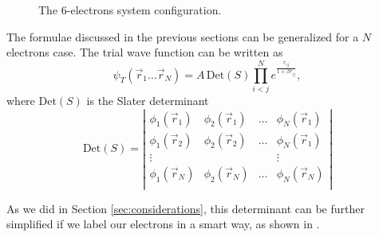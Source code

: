 \documentclass[a4paper,twoside,11pt]{book}
\begin{document}
\begin{figure}[H]
	\centering
	\caption{The 6-electrons system configuration.}
	\label{eq:sketch_6e}
\end{figure}

The formulae discussed in the previous sections can be generalized for a $N$ electrons case. The trial wave function can be written as
\begin{equation}
	\psi_T(\vec{r}_1 \dots \vec{r}_N)= A \,  \text{Det}(S) \prod_{i<j}^N e^{\frac{r_{ij}}{1+\beta r_{ij}}},
\end{equation}
where $\text{Det}(S)$ is the Slater determinant
\begin{equation}
	\text{Det}(S)= \left|
	\begin{matrix}
		\phi_1(\vec{r}_1) & \phi_2(\vec{r}_1) & \dots & \phi_N(\vec{r}_1) \\
		\phi_1(\vec{r}_2) & \phi_2(\vec{r}_2) & \dots & \phi_N(\vec{r}_1) \\
		\vdots &  &  & \vdots \\
		\phi_1(\vec{r}_N) & \phi_2(\vec{r}_N) & \dots & \phi_N(\vec{r}_N) \\
	\end{matrix}
	\right|
\end{equation}

As we did in Section \ref{sec:considerations}, this determinant can be further simplified if we label our electrons in a smart way, as shown in \cite{morten}.
\end{document}
